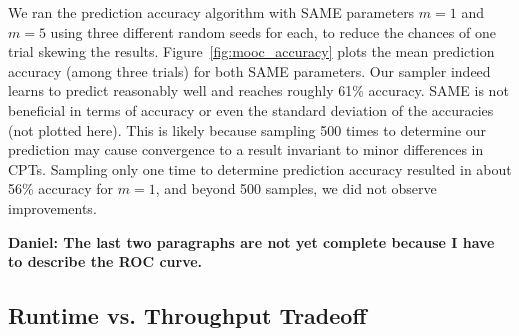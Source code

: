 \documentclass{article} %
\begin{document}
We ran the prediction accuracy algorithm with SAME parameters $m=1$ and $m=5$ using three different
random seeds for each, to reduce the chances of one trial skewing the results.
Figure~\ref{fig:mooc_accuracy} plots the mean prediction accuracy (among three trials) for both SAME
parameters. Our sampler indeed learns to predict reasonably well and reaches roughly 61\% accuracy.
SAME is not beneficial in terms of accuracy or even the standard deviation of the accuracies (not
plotted here). This is likely because sampling 500 times to determine our prediction may cause
convergence to a result invariant to minor differences in CPTs.  Sampling only one time to determine
prediction accuracy resulted in about 56\% accuracy for $m=1$, and beyond 500 samples, we did not
observe improvements.

\textbf{Daniel: The last two paragraphs are not yet complete because I have to describe the ROC
curve.}

\subsection{Runtime vs. Throughput Tradeoff}\label{ssec:tradeoff}

%
%
\end{document}
